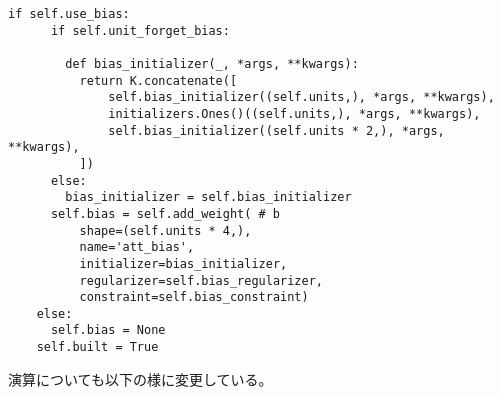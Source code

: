 \begin{lstlisting}[caption=デコーダー部の変更点, label=Decoder]
    if self.use_bias:
      if self.unit_forget_bias:

        def bias_initializer(_, *args, **kwargs):
          return K.concatenate([
              self.bias_initializer((self.units,), *args, **kwargs),
              initializers.Ones()((self.units,), *args, **kwargs),
              self.bias_initializer((self.units * 2,), *args, **kwargs),
          ])
      else:
        bias_initializer = self.bias_initializer
      self.bias = self.add_weight( # b
          shape=(self.units * 4,),
          name='att_bias',
          initializer=bias_initializer,
          regularizer=self.bias_regularizer,
          constraint=self.bias_constraint)
    else:
      self.bias = None
    self.built = True
\end{lstlisting}

演算についても以下の様に変更している。

